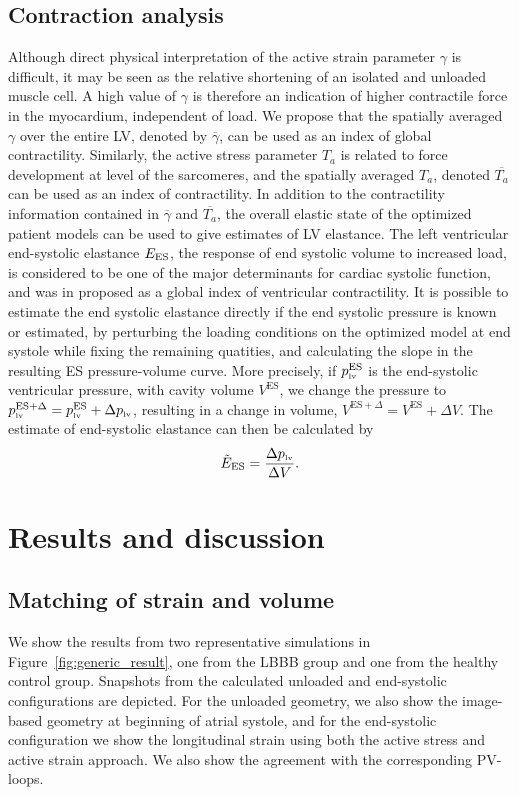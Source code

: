 \subsection{Contraction analysis}
Although direct physical interpretation of the active
  strain parameter $\gamma$ is difficult, it may be seen as the
  relative shortening of an isolated and unloaded muscle cell. A high
  value of $\gamma$ is therefore an indication of higher contractile
  force in the myocardium, independent of load. We propose that
  the spatially averaged $\gamma$ over the entire LV, denoted by  
  $\overline{\gamma}$, can be used as an index of global
  contractility. Similarly, the active stress parameter $T_a$ is related to force
  development at level of the sarcomeres\cite{goktepe2014generalized},
  and the spatially averaged 
  $T_a$, denoted $\overline{T_a}$ can be used as an index of
  contractility. In addition to the contractility information contained in 
$\overline{\gamma}$ and $\overline{T_a}$, the overall elastic state
of the optimized patient models 
can be used to give estimates of LV elastance. The left ventricular
end-systolic elastance $E_{\text{ES}}$, the response of end systolic volume to
increased load, is considered to be one of the major determinants for
cardiac systolic function, and was in \cite{sagawa1977end} proposed
as a global index of ventricular contractility.
It is possible to estimate the end systolic elastance directly 
if the end systolic pressure is known or estimated, 
by perturbing the loading conditions on the optimized model at end
systole while fixing the remaining quatities, and calculating the slope
in the resulting ES pressure-volume curve. More
precisely, if $p_{\textnormal{\tiny{lv}}}^{\text{ES}}$ is the end-systolic ventricular
pressure, with cavity volume $V^{\text{ES}}$, 
we change the pressure to $p_{\textnormal{\tiny{lv}}}^{\text{ES} + \Delta} =
p_{\textnormal{\tiny{lv}}}^{\text{ES}} + \Delta p_{\textnormal{\tiny{lv}}}$, resulting in a change in volume,
$V^{\text{ES} +\Delta} = V^{\text{ES}} + \Delta V$. The estimate of end-systolic
elastance can then be calculated by 
\begin{align}
  \tilde{E}_{\text{ES}} = \frac{\Delta p_{\textnormal{\tiny{lv}}}}{\Delta V}.
  \label{eq:estimate_elastance}
\end{align}



\section{Results and discussion}
\label{sec:results}


\subsection{Matching of strain and volume}
We show the results from two representative simulations in
Figure~\ref{fig:generic_result}, one from the LBBB group and one from
the healthy control group. Snapshots from the calculated unloaded and
end-systolic configurations are depicted. For the unloaded
geometry, we also show the image-based geometry at beginning of atrial
systole, and for the end-systolic configuration we show the
longitudinal strain using both the active stress and active strain
approach. We also show the agreement with the corresponding PV-loops.


